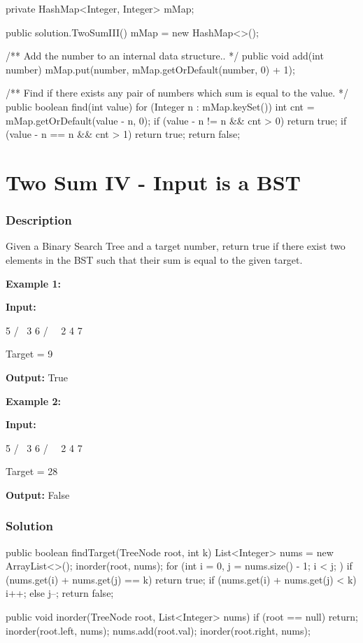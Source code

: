 \begin{Code}
private HashMap<Integer, Integer> mMap;

public solution.TwoSumIII() {
    mMap = new HashMap<>();
}

/** Add the number to an internal data structure.. */
public void add(int number) {
    mMap.put(number, mMap.getOrDefault(number, 0) + 1);
}

/** Find if there exists any pair of numbers which sum is equal to the value. */
public boolean find(int value) {
    for (Integer n : mMap.keySet()) {
        int cnt = mMap.getOrDefault(value - n, 0);
        if (value - n != n && cnt > 0) {
            return true;
        }
        if (value - n == n && cnt > 1) {
            return true;
        }
    }
    return false;
}
\end{Code}

\newpage

\section{Two Sum IV - Input is a BST} %

\subsubsection{Description}
Given a Binary Search Tree and a target number, return true if there exist two elements in the BST such that their sum is equal to the given target.

\textbf{Example 1:}

\textbf{Input:}
\begin{Code}
    5
   / \
  3   6
 / \   \
2   4   7
\end{Code}

Target = 9

\textbf{Output:} True

\textbf{Example 2:}

\textbf{Input:}
\begin{Code}
    5
   / \
  3   6
 / \   \
2   4   7
\end{Code}

Target = 28

\textbf{Output:} False

\subsubsection{Solution}

\begin{Code}
public boolean findTarget(TreeNode root, int k) {
    List<Integer> nums = new ArrayList<>();
    inorder(root, nums);
    for (int i = 0, j = nums.size() - 1; i < j; ) {
        if (nums.get(i) + nums.get(j) == k) return true;
        if (nums.get(i) + nums.get(j) < k) i++;
        else j--;
    }
    return false;
}

public void inorder(TreeNode root, List<Integer> nums) {
    if (root == null) return;
    inorder(root.left, nums);
    nums.add(root.val);
    inorder(root.right, nums);
}
\end{Code}

